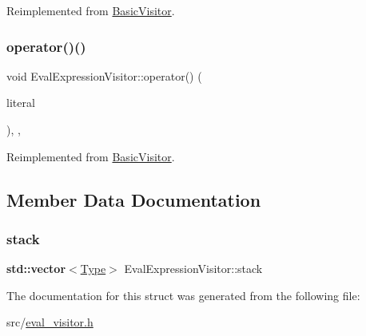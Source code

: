 Reimplemented from \hyperlink{struct_basic_visitor_a9433a6a9dcdd64f97ea1c392208a3305}{Basic\+Visitor}.

\mbox{\label{struct_eval_expression_visitor_a4eb471ad8286c264eb2af55aaf6c5a45}} 
\subsubsection{\texorpdfstring{operator()()}{operator()()}\hspace{0.1cm}{\footnotesize\ttfamily [2/2]}}
{\footnotesize\ttfamily void Eval\+Expression\+Visitor\+::operator() (\begin{DoxyParamCaption}\item[{const \hyperlink{struct_numeric_literal}{Numeric\+Literal} \&}]{literal }\end{DoxyParamCaption})\hspace{0.3cm}{\ttfamily [inline]}, {\ttfamily [override]}, {\ttfamily [virtual]}}



Reimplemented from \hyperlink{struct_basic_visitor_a177e744fc03783b7fbb83d3292a7c029}{Basic\+Visitor}.



\subsection{Member Data Documentation}
\mbox{\label{struct_eval_expression_visitor_acff7a9754c87fac4c34bbb6ad3318cae}} 
\subsubsection{\texorpdfstring{stack}{stack}}
{\footnotesize\ttfamily \textbf{ std\+::vector}$<$\hyperlink{class_type}{Type}$>$ Eval\+Expression\+Visitor\+::stack}



The documentation for this struct was generated from the following file\+:\begin{DoxyCompactItemize}
\item 
src/\hyperlink{eval__visitor_8h}{eval\+\_\+visitor.\+h}\end{DoxyCompactItemize}
